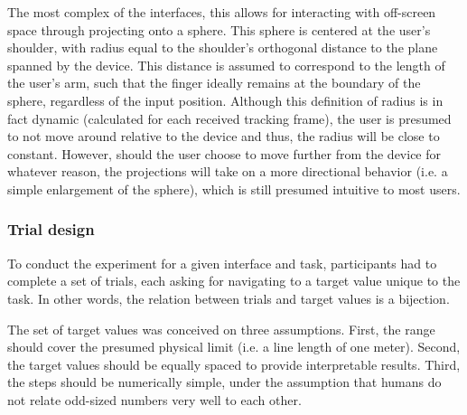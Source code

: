 
The most complex of the interfaces, this allows for interacting with off-screen space through projecting onto a sphere. This sphere is centered at the user's shoulder, with radius equal to the shoulder's orthogonal distance to the plane spanned by the device. This distance is assumed to correspond to the length of the user's arm, such that the finger ideally remains at the boundary of the sphere, regardless of the input position. Although this definition of radius is in fact dynamic (calculated for each received tracking frame), the user is presumed to not move around relative to the device and thus, the radius will be close to constant. However, should the user choose to move further from the device for whatever reason, the projections will take on a more directional behavior (i.e. a simple enlargement of the sphere), which is still presumed intuitive to most users.


%
%
%
%
%

\subsubsection{Trial design}

To conduct the experiment for a given interface and task, participants had to complete a set of trials, each asking for navigating to a target value unique to the task. In other words, the relation between trials and target values is a bijection. 

The set of target values was conceived on three assumptions. First, the range should cover the presumed physical limit (i.e. a line length of one meter). Second, the target values should be equally spaced to provide interpretable results. Third, the steps should be numerically simple, under the assumption that humans do not relate odd-sized numbers very well to each other. 


